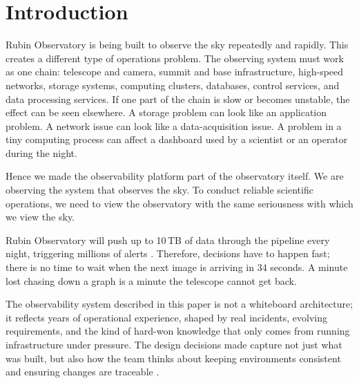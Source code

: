 \section{Introduction}

Rubin Observatory is being built to observe the sky repeatedly and rapidly. This creates a
different type of operations problem. The observing system must work as one chain: telescope and
camera, summit and base infrastructure, high-speed networks, storage systems, computing clusters,
databases, control services, and data processing services. If one part of the chain is slow or
becomes unstable, the effect can be seen elsewhere. A storage problem can look like an application
problem. A network issue can look like a data-acquisition issue. A problem in a tiny computing
process can affect a dashboard used by a scientist or an operator during the night.

Hence we made the observability platform part of the observatory itself. We are observing the
system that observes the sky. To conduct reliable scientific operations, we need to view the
observatory with the same seriousness with which we view the sky.

Rubin Observatory will push up to 10\,TB of data through the pipeline every night, triggering
millions of alerts \cite{2019ApJ...873..111I}. Therefore, decisions have to
happen fast; there is no time to wait when the next image is arriving in 34 seconds. A minute lost
chasing down a graph is a minute the telescope cannot get back.

The observability system described in this paper is not a whiteboard architecture; it reflects
years of operational experience, shaped by real incidents, evolving requirements, and the kind of
hard-won knowledge that only comes from running infrastructure under pressure. The design decisions
made capture not just what was built, but also how the team thinks about keeping environments
consistent and ensuring changes are traceable \cite{lsst-it-k8s-cookbook}.